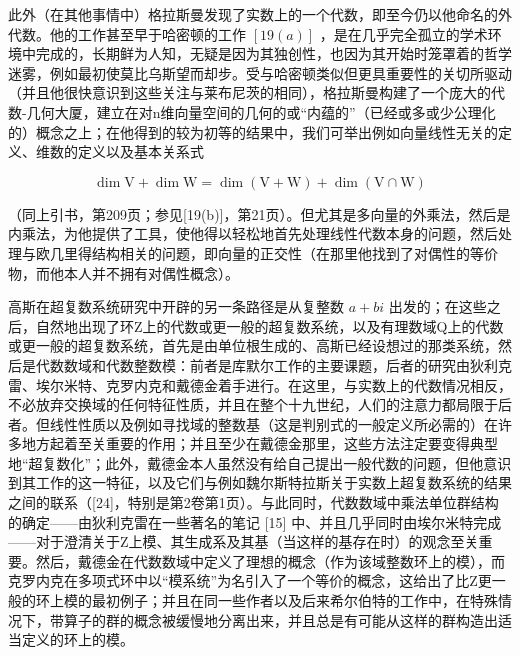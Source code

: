 此外（在其他事情中）格拉斯曼发现了实数上的一个代数，即至今仍以他命名的外代数。他的工作甚至早于哈密顿的工作 \([19(a)]\) ，是在几乎完全孤立的学术环境中完成的，长期鲜为人知，无疑是因为其独创性，也因为其开始时笼罩着的哲学迷雾，例如最初使莫比乌斯望而却步。受与哈密顿类似但更具重要性的关切所驱动（并且他很快意识到这些关注与莱布尼茨的相同），格拉斯曼构建了一个庞大的代数-几何大厦，建立在对n维向量空间的几何的或“内蕴的”（已经或多或少公理化的）概念之上；在他得到的较为初等的结果中，我们可举出例如向量线性无关的定义、维数的定义以及基本关系式

\[
\dim \mathrm{V} + \dim \mathrm{W} = \dim (\mathrm{V} + \mathrm{W}) + \dim (\mathrm{V} \cap \mathrm{W})
\]

（同上引书，第209页；参见{[}19(b){]}，第21页）。但尤其是多向量的外乘法，然后是内乘法，为他提供了工具，使他得以轻松地首先处理线性代数本身的问题，然后处理与欧几里得结构相关的问题，即向量的正交性（在那里他找到了对偶性的等价物，而他本人并不拥有对偶性概念）。

高斯在超复数系统研究中开辟的另一条路径是从复整数 \(a + bi\) 出发的；在这些之后，自然地出现了环Z上的代数或更一般的超复数系统，以及有理数域Q上的代数或更一般的超复数系统，首先是由单位根生成的、高斯已经设想过的那类系统，然后是代数数域和代数整数模：前者是库默尔工作的主要课题，后者的研究由狄利克雷、埃尔米特、克罗内克和戴德金着手进行。在这里，与实数上的代数情况相反，不必放弃交换域的任何特征性质，并且在整个十九世纪，人们的注意力都局限于后者。但线性性质以及例如寻找域的整数基（这是判别式的一般定义所必需的）在许多地方起着至关重要的作用；并且至少在戴德金那里，这些方法注定要变得典型地“超复数化”；此外，戴德金本人虽然没有给自己提出一般代数的问题，但他意识到其工作的这一特征，以及它们与例如魏尔斯特拉斯关于实数上超复数系统的结果之间的联系（{[}24{]}，特别是第2卷第1页）。与此同时，代数数域中乘法单位群结构的确定——由狄利克雷在一些著名的笔记 {[}15{]} 中、并且几乎同时由埃尔米特完成——对于澄清关于Z上模、其生成系及其基（当这样的基存在时）的观念至关重要。然后，戴德金在代数数域中定义了理想的概念（作为该域整数环上的模），而克罗内克在多项式环中以“模系统”为名引入了一个等价的概念，这给出了比Z更一般的环上模的最初例子；并且在同一些作者以及后来希尔伯特的工作中，在特殊情况下，带算子的群的概念被缓慢地分离出来，并且总是有可能从这样的群构造出适当定义的环上的模。

